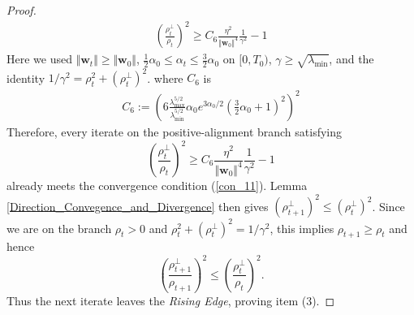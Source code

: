 \documentclass[pdflatex,sn-basic]{sn-jnl}%
\theoremstyle{thmstyleone}%
\begin{document}
\begin{appendices}
\begin{proof}
\begin{equation*}
\begin{aligned}
    \left(
      \frac{\rho_t^\perp}{\rho_t}
    \right)^2
    \ge
    C_6
    \frac{\eta^2}{\Vert \mathbf{w}_0 \Vert^4}
    \frac{1}{\gamma^2}
    - 1
  \end{aligned}
  \end{equation*}
  Here we used $\Vert \mathbf{w}_t \Vert \ge \Vert \mathbf{w}_0 \Vert$, $\frac{1}{2}\alpha_0 \le \alpha_t \le \frac{3}{2}\alpha_0$ on $[0, T_0)$, $\gamma \ge \sqrt{\lambda_{\min}}$, and the identity $1/\gamma^2 = \rho_t^2 + (\rho_t^\perp)^2$.
  where $C_6$ is 
  \begin{equation*}
  \begin{aligned}
    C_6 := 
    \left(
      6
      \frac{\lambda_{\max}^{5/2}}{\lambda_{\min}^{5/2} }
      \alpha_0 e^{3 \alpha_0 / 2}\left( \frac{3}{2} \alpha_0 + 1 \right)^2
    \right)^2
  \end{aligned}
  \end{equation*}
  Therefore, every iterate on the positive-alignment branch satisfying
  \[
    \left(
      \frac{\rho_t^\perp}{\rho_t}
    \right)^2
    \ge
    C_6
    \frac{\eta^2}{\Vert \mathbf{w}_0 \Vert^4}
    \frac{1}{\gamma^2}
    - 1
  \]
  already meets the convergence condition (\ref{con_11}). Lemma \ref{Direction_Convegence_and_Divergence} then gives $\left(\rho_{t+1}^\perp\right)^2 \le \left(\rho_t^\perp\right)^2$. Since we are on the branch $\rho_t > 0$ and $\rho_t^2 + \left(\rho_t^\perp\right)^2 = 1/\gamma^2$, this implies $\rho_{t+1} \ge \rho_t$ and hence
  \[
    \left(
      \frac{\rho_{t+1}^\perp}{\rho_{t+1}}
    \right)^2
    \le
    \left(
      \frac{\rho_t^\perp}{\rho_t}
    \right)^2.
  \]
  Thus the next iterate leaves the \textit{Rising Edge}, proving item (3).
\end{proof}

\end{appendices}

\end{document}
